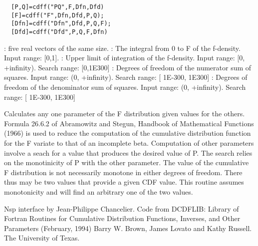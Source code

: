 
\begin{mandesc}
\end{mandesc}
\label{cdff}
\begin{calling_sequence}
\begin{verbatim}
  [P,Q]=cdff("PQ",F,Dfn,Dfd)  
  [F]=cdff("F",Dfn,Dfd,P,Q);  
  [Dfn]=cdff("Dfn",Dfd,P,Q,F);  
  [Dfd]=cdff("Dfd",P,Q,F,Dfn)  
\end{verbatim}
\end{calling_sequence}
\begin{parameters}
  \begin{varlist}
     : five real vectors of the same size.
     :  The integral from 0 to F of the f-density. Input range: [0,1].
     : Upper limit of integration of the f-density. Input range: [0, +infinity). Search range: [0,1E300]
       : Degrees of freedom of the numerator sum of squares. Input range: (0, +infinity). Search range: [ 1E-300, 1E300]
       : Degrees of freedom of the denominator sum of squares. Input range: (0, +infinity). Search range: [ 1E-300, 1E300]
  \end{varlist}
\end{parameters}
\begin{mandescription}
  Calculates any one parameter of the F distribution
  given values for the others.
  Formula   26.6.2   of   Abramowitz   and   Stegun,  Handbook  of
  Mathematical  Functions (1966) is used to reduce the computation
  of the  cumulative  distribution function for the  F  variate to
  that of an incomplete beta.
  Computation of other parameters involve a seach for a value that
  produces  the desired  value  of P.   The search relies  on  the
  monotinicity of P with the other parameter.
  The value of the  cumulative  F distribution is  not necessarily
  monotone in  either degrees of freedom.  There  thus may  be two
  values  that  provide a given CDF  value.   This routine assumes
  monotonicity and will find an arbitrary one of the two values.
\end{mandescription}

\begin{authors}
  Nsp interface by Jean-Philippe Chancelier. Code from DCDFLIB: 
  Library of Fortran Routines for Cumulative Distribution
  Functions, Inverses, and Other Parameters (February, 1994)
  Barry W. Brown, James Lovato and Kathy Russell. The University of Texas.
\end{authors}
